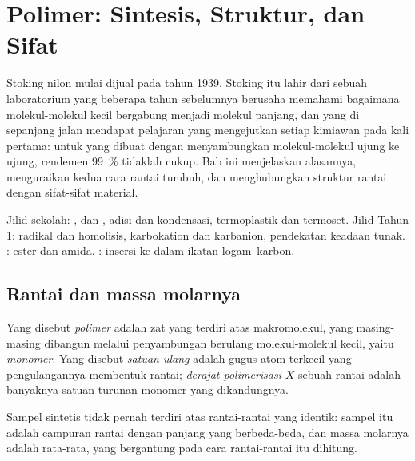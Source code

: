\chapter{Polimer: Sintesis, Struktur, dan Sifat}\label{ch:b2:polymer-synthesis}

Stoking nilon mulai dijual pada tahun 1939. Stoking itu lahir dari sebuah
laboratorium yang beberapa tahun sebelumnya berusaha memahami bagaimana
molekul-molekul kecil bergabung menjadi molekul panjang, dan yang di
sepanjang jalan mendapat pelajaran yang mengejutkan setiap kimiawan pada
kali pertama: untuk  yang dibuat dengan menyambungkan molekul-molekul
ujung ke ujung, rendemen 99~\% tidaklah cukup. Bab ini menjelaskan alasannya,
menguraikan kedua cara rantai tumbuh, dan menghubungkan struktur rantai
dengan sifat-sifat material.

\begin{recall}
Jilid sekolah: ,  dan ,  adisi dan 
kondensasi, termoplastik dan termoset. Jilid Tahun 1: radikal dan homolisis,
karbokation dan karbanion, pendekatan keadaan tunak.
: ester dan amida.
: insersi ke dalam ikatan logam--karbon.
\end{recall}

\section{Rantai dan massa molarnya}

\begin{definition}[Polimer]\label{def:b2:polymer-synthesis:polymer}
Yang disebut \emph{polimer} adalah zat yang terdiri atas
makromolekul, yang masing-masing dibangun melalui penyambungan berulang
molekul-molekul kecil, yaitu \emph{monomer}. Yang disebut
\emph{satuan ulang} adalah gugus atom terkecil yang
pengulangannya membentuk rantai; \emph{derajat
polimerisasi} $X$ sebuah rantai adalah banyaknya
satuan turunan monomer yang dikandungnya.
\end{definition}

Sampel  sintetis tidak pernah terdiri atas rantai-rantai yang
identik: sampel itu adalah campuran rantai dengan panjang yang berbeda-beda,
dan massa molarnya adalah rata-rata, yang bergantung pada cara rantai-rantai
itu dihitung.

